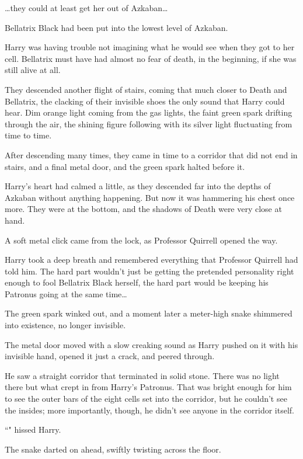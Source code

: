 {\ldots}they could at least get her out of Azkaban{\ldots}

Bellatrix Black had been put into the lowest level of Azkaban.

Harry was having trouble not imagining what he would see when they got to her cell. Bellatrix must have had almost no fear of death, in the beginning, if she was still alive at all.

They descended another flight of stairs, coming that much closer to Death and Bellatrix, the clacking of their invisible shoes the only sound that Harry could hear. Dim orange light coming from the gas lights, the faint green spark drifting through the air, the shining figure following with its silver light fluctuating from time to time.

\later

After descending many times, they came in time to a corridor that did not end in stairs, and a final metal door, and the green spark halted before it.

Harry's heart had calmed a little, as they descended far into the depths of Azkaban without anything happening. But now it was hammering his chest once more. They were at the bottom, and the shadows of Death were very close at hand.

A soft metal click came from the lock, as Professor Quirrell opened the way.

Harry took a deep breath and remembered everything that Professor Quirrell had told him. The hard part wouldn't just be getting the pretended personality right enough to fool Bellatrix Black herself, the hard part would be keeping his Patronus going at the same time{\ldots}

The green spark winked out, and a moment later a meter-high snake shimmered into existence, no longer invisible.

The metal door moved with a slow creaking sound as Harry pushed on it with his invisible hand, opened it just a crack, and peered through.

He saw a straight corridor that terminated in solid stone. There was no light there but what crept in from Harry's Patronus. That was bright enough for him to see the outer bars of the eight cells set into the corridor, but he couldn't see the insides; more importantly, though, he didn't see anyone in the corridor itself.

``" hissed Harry.

The snake darted on ahead, swiftly twisting across the floor.

